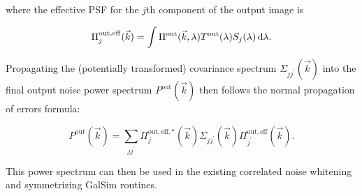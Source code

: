 \documentclass{article}
\begin{document}
where the effective PSF for the $j$th component of the output image is

\begin{equation}
  \Pi_j^\mathrm{out, eff}(\vec{k}) = \int \Pi^\mathrm{out}(\vec{k}, \lambda) T^\mathrm{out}(\lambda) S_j(\lambda)\dif{\lambda}.
\end{equation}

Propagating the (potentially transformed) covariance spectrum $\Sigma_{jj^\prime}(\vec{k})$ into the
final output noise power spectrum $P^\mathrm{out}(\vec{k})$ then follows the normal propagation of
errors formula:

\begin{equation}
  P^\mathrm{out}(\vec{k}) = \sum_{jj^\prime} \Pi_j^\mathrm{out, eff, *}(\vec{k}) \Sigma_{jj^\prime}(\vec{k}) \Pi_{j^\prime}^\mathrm{out, eff}(\vec{k}).
\end{equation}

This power spectrum can then be used in the existing correlated noise whitening and symmetrizing
GalSim routines.
\end{document}
